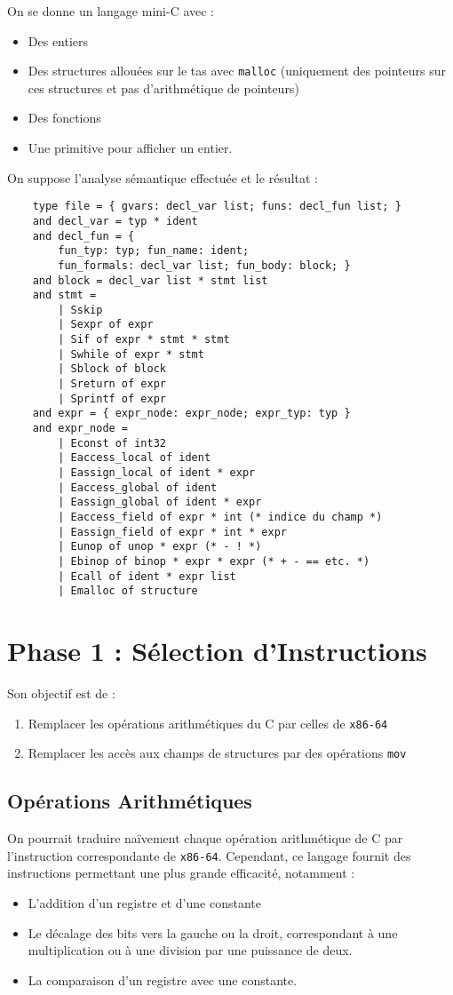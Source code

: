 \documentclass{cours}
\begin{document}
On se donne un langage mini-C avec :
\begin{itemize}
    \item Des entiers
    \item Des structures allouées sur le tas avec \texttt{malloc} (uniquement des pointeurs sur ces structures et pas d'arithmétique de pointeurs)
    \item Des fonctions
    \item Une primitive pour afficher un entier.
\end{itemize}

On suppose l'analyse sémantique effectuée et le résultat :
\begin{verbatim}
    type file = { gvars: decl_var list; funs: decl_fun list; }
    and decl_var = typ * ident
    and decl_fun = {
        fun_typ: typ; fun_name: ident;
        fun_formals: decl_var list; fun_body: block; }
    and block = decl_var list * stmt list
    and stmt =
        | Sskip
        | Sexpr of expr
        | Sif of expr * stmt * stmt
        | Swhile of expr * stmt
        | Sblock of block
        | Sreturn of expr
        | Sprintf of expr
    and expr = { expr_node: expr_node; expr_typ: typ }
    and expr_node =
        | Econst of int32
        | Eaccess_local of ident
        | Eassign_local of ident * expr
        | Eaccess_global of ident
        | Eassign_global of ident * expr
        | Eaccess_field of expr * int (* indice du champ *)
        | Eassign_field of expr * int * expr
        | Eunop of unop * expr (* - ! *)
        | Ebinop of binop * expr * expr (* + - == etc. *)
        | Ecall of ident * expr list
        | Emalloc of structure
\end{verbatim}

\section{Phase 1 : Sélection d'Instructions}
Son objectif est de :
\begin{enumerate}
    \item Remplacer les opérations arithmétiques du C par celles de \texttt{x86-64}
    \item Remplacer les accès aux champs de structures par des opérations \texttt{mov}
\end{enumerate}
\subsection{Opérations Arithmétiques}
On pourrait traduire naïvement chaque opération arithmétique de C par l'instruction correspondante de \texttt{x86-64}. Cependant, ce langage fournit des instructions permettant une plus grande efficacité, notamment :
\begin{itemize}
    \item L'addition d'un registre et d'une constante
    \item Le décalage des bits vers la gauche ou la droit, correspondant à une multiplication ou à une division par une puissance de deux.
    \item La comparaison d'un registre avec une constante.
\end{itemize}
\end{document}
